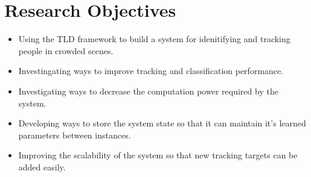 \section{Research Objectives}
\begin{itemize}
  \item
    Using the TLD framework to build a system for idenitifying and tracking people in crowded scenes.
  \item
    Investingating ways to improve tracking and classification performance.
  \item
    Investigating ways to decrease the computation power required by the system.
  \item
    Developing ways to store the system state so that it can maintain it's learned parameters between instances.
  \item
    Improving the scalability of the system so that new tracking targets can be added easily.  
\end{itemize}

